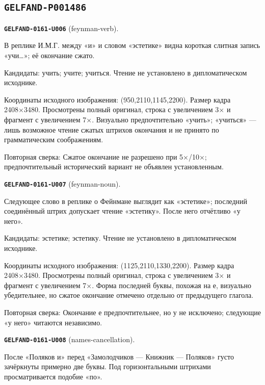 \subsection*{\texttt{GELFAND-P001486}}
\par\noindent\leavevmode{}\label{GELFAND-0161-U006}\label{GELFAND-P001486:feynman-verb}\textbf{\texttt{GELFAND-0161-U006}} (feynman-verb).\nopagebreak[4]\par
В реплике И.М.Г. между «и» и словом «эстетике» видна короткая слитная запись «учи…»; её окончание сжато.\par
Кандидаты: учить; учите; учиться. Чтение не установлено в дипломатическом исходнике.\par
Координаты исходного изображения: (950,2110,1145,2200). Размер кадра 2408×3480. Просмотрены полный оригинал, строка с увеличением 3× и фрагмент с увеличением 7×. Визуально предпочтительно «учить»; «учиться» — лишь возможное чтение сжатых штрихов окончания и не принято по грамматическим соображениям.\par
Повторная сверка: Сжатое окончание не разрешено при 5×/10×; предпочтительный исторический вариант не объявлен установленным.\par\medskip
\par\noindent\leavevmode{}\label{GELFAND-0161-U007}\label{GELFAND-P001486:feynman-noun}\textbf{\texttt{GELFAND-0161-U007}} (feynman-noun).\nopagebreak[4]\par
Следующее слово в реплике о Фейнмане выглядит как «эстетике»; последний соединённый штрих допускает чтение «эстетику». После него отчётливо «у него».\par
Кандидаты: эстетике; эстетику. Чтение не установлено в дипломатическом исходнике.\par
Координаты исходного изображения: (1125,2110,1330,2200). Размер кадра 2408×3480. Просмотрены полный оригинал, строка с увеличением 3× и фрагмент с увеличением 7×. Форма последней буквы, похожая на е, визуально убедительнее, но сжатое окончание отмечено отдельно от предыдущего глагола.\par
Повторная сверка: Окончание е предпочтительнее, но у не исключено; следующие «у него» читаются независимо.\par\medskip
\par\noindent\leavevmode{}\label{GELFAND-0161-U008}\label{GELFAND-P001486:names-cancellation}\textbf{\texttt{GELFAND-0161-U008}} (names-cancellation).\nopagebreak[4]\par
После «Поляков и» перед «Замолодчиков — Книжник — Поляков» густо зачёркнуты примерно две буквы. Под горизонтальными штрихами просматривается подобие «по».\par
